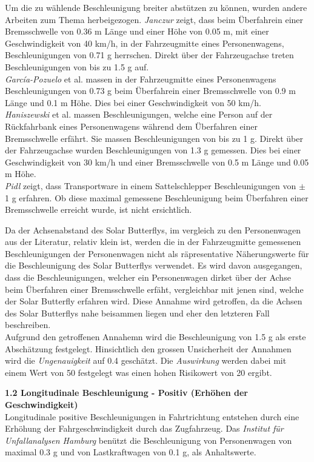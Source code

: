 \begin{description}
    Um die zu wählende Beschleunigung breiter abstützen zu können, wurden andere Arbeiten zum Thema herbeigezogen. \emph{Janczur} \cite{Beschl.1} zeigt, dass beim Überfahrein einer Bremsschwelle von 0.36 m Länge und einer Höhe von 0.05 m, mit einer Geschwindigkeit von 40 km/h, in der Fahrzeugmitte eines Personenwagens, Beschleunigungen von 0.71 g herrschen. Direkt über der Fahrzeugachse treten Beschleunigungen von bis zu 1.5 g auf.\\
    \emph{García-Pozuelo} et al. \cite{Beschl.2} massen in der Fahrzeugmitte eines Personenwagens Beschleunigungen von 0.73 g beim Überfahrein einer Bremsschwelle von 0.9 m Länge und 0.1 m Höhe. Dies bei einer Geschwindigkeit von 50 km/h.\\
    \emph{Haniszewski} et al. \cite{Beschl.3} massen Beschleunigungen, welche eine Person auf der Rückfahrbank eines Personenwagens während dem Überfahren einer Bremsschwelle erfährt. Sie massen Beschleunigungen von bis zu 1 g. Direkt über der Fahrzeugachse wurden Beschleunigungen von 1.3 g gemessen. Dies bei einer Geschwindigkeit von 30 km/h und einer Bremsschwelle von 0.5 m Länge und 0.05 m Höhe.\\
    \emph{Pidl} \cite{Beschl.4} zeigt, dass Transportware in einem Sattelschlepper Beschleunigungen von $\pm$ 1 g erfahren. Ob diese maximal gemessene Beschleunigung beim Überfahren einer Bremsschwelle erreicht wurde, ist nicht ersichtlich.

    Da der Achsenabstand des Solar Butterflys, im vergleich zu den Personenwagen aus der Literatur, relativ klein ist, werden die in der Fahrzeugmitte gemessenen Beschleunigungen der Personenwagen nicht als räpresentative Näherungswerte für die Beschleunigung des Solar Butterflys verwendet. Es wird davon ausgegangen, dass die Beschleunigungen, welcher ein Personenwagen dirket über der Achse beim Überfahren einer Bremsschwelle erfäht, vergleichbar mit jenen sind, welche der Solar Butterfly erfahren wird. Diese Annahme wird getroffen, da die Achsen des Solar Butterflys nahe beisammen liegen und eher den letzteren Fall beschreiben.\\
    Aufgrund den getroffenen Annahemn wird die Beschleunigung von 1.5 g als erste Abschätzung festgelegt. Hinsichtlich den grossen Unsicherheit der Annahmen wird die \emph{Ungenauigkeit} auf 0.4 geschätzt. Die \emph{Auswirkung} werden dabei mit einem Wert von 50 festgelegt was einen hohen Risikowert von 20 ergibt.

    \item \textbf{1.2 Longitudinale Beschleunigung - Positiv (Erhöhen der Geschwindigkeit)}\\
    Longitudinale positive Beschleunigungen in Fahrtrichtung entstehen durch eine Erhöhung der Fahrgeschwindigkeit durch das Zugfahrzeug. Das \emph{Institut für Unfallanalysen Hamburg} \cite{Verz.3} benützt die Beschleunigung von Personenwagen von maximal 0.3 g und von Lastkraftwagen von 0.1 g, als Anhaltswerte.


\end{description}
